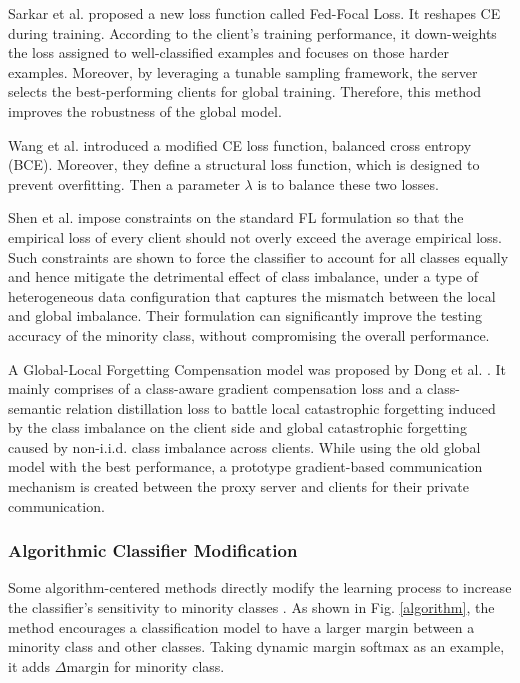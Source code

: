 \documentclass[10pt,journal,compsoc]{IEEEtran}
\begin{document}
Sarkar et al. \cite{sarkar2020fed} proposed a new loss function called Fed-Focal Loss. It reshapes CE during training. According to the client's training performance, it down-weights the loss assigned to well-classified examples and focuses on those harder examples. Moreover, by leveraging a tunable sampling framework, the server selects the best-performing clients for global training. Therefore, this method improves the robustness of the global model. 

Wang et al. \cite{wang2021federated} introduced a modified CE loss function, balanced cross entropy (BCE). Moreover, they define a structural loss function, which is designed to prevent overfitting. Then a parameter $ \lambda $  is to balance these two losses.

Shen et al. \cite{shen2021agnostic} impose constraints on the standard FL formulation so that the empirical loss of every client should not overly exceed the average empirical loss. Such constraints are shown to force the classifier to account for all classes equally and hence mitigate the detrimental effect of class imbalance, under a type of heterogeneous data configuration that captures the mismatch between the local and global imbalance. Their formulation can significantly improve the testing accuracy of the minority class, without compromising the overall performance.

A Global-Local Forgetting Compensation model was proposed by Dong et al. \cite{dong2022federated}. It mainly comprises of a class-aware gradient compensation loss and a class-semantic relation distillation loss to battle local catastrophic forgetting induced by the class imbalance on the client side and global catastrophic forgetting caused by non-i.i.d. class imbalance across clients. While using the old global model with the best performance, a prototype gradient-based communication mechanism is created between the proxy server and clients for their private communication.
\vspace{-0.2cm}

\subsubsection{Algorithmic Classifier Modification}
Some algorithm-centered methods directly modify the learning process to increase the classifier's sensitivity to minority classes \cite{khan2017cost}. As shown in Fig. \ref{algorithm}, the method encourages a classification model to have a larger margin between a minority class and other classes. Taking dynamic margin softmax as an example, it adds $ \Delta $margin for minority class. 
\end{document}
